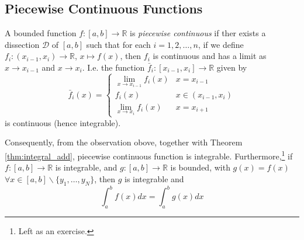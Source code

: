 \documentclass[10pt, a4paper, twoside]{report}
\begin{document}
\subsection{Piecewise Continuous Functions}
\begin{definition}
    A bounded function \(f:[a,b]\to\mathbb{R}\) is \emph{piecewise continuous} if ther exists a dissection \(\mathcal{D}\) of \([a,b]\) such that for each \(i=1,2,\ldots,n\), if we define \(f_i:(x_{i-1},x_i)\to\mathbb{R}\), \(x\mapsto f(x)\), then \(f_i\) is continuous and has a limit as \(x\to x_{i-1}\) and \(x\to x_{i}\). I.e. the function \(\bar{f}_i:[x_{i-1},x_i]\to\mathbb{R}\) given by 
    \[\bar{f}_i(x)=\begin{cases}
        \lim_{x\to x_{i-1}}f_i(x) & x=x_{i-1} \\
        f_i(x) & x\in(x_{i-1},x_i) \\
        \lim_{x\to x_i} f_i(x) & x=x_{i+1}
    \end{cases}\] 
    is continuous (hence integrable).
    \label{def:piecewise_cont}
\end{definition}
Consequently, from the observation obove, together with Theorem \ref{thm:integral_add}, piecewise continuous function is integrable. Furthermore,\footnote{Left as an exercise.} if \(f:[a,b]\to\mathbb{R}\) is integrable, and \(g:[a,b]\to\mathbb{R}\) is bounded, with \(g(x)=f(x)\) \(\forall x\in[a,b]\backslash\{y_1,\ldots,y_N\}\), then \(g\) is integrable and 
\[\int_a^bf(x)dx=\int_a^bg(x)dx\]
\end{document}

